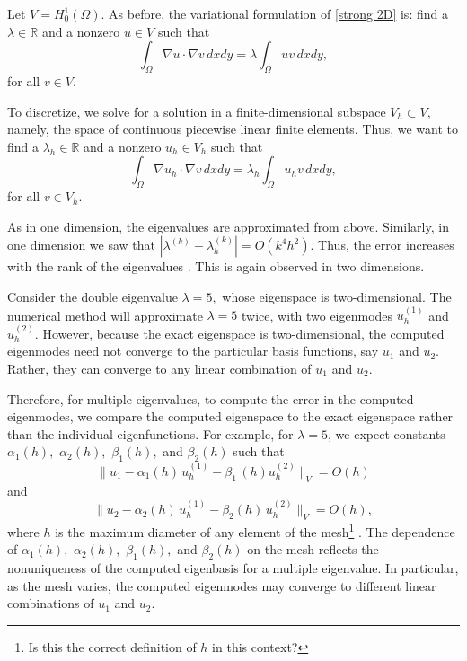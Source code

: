 \documentclass[12pt,a4paper]{article}
\theoremstyle{boldthm}
\theoremstyle{bolddefn}
\begin{document}
Let $V = H_0^1(\Omega).$ As before, the variational formulation of \eqref{strong 2D} is: find a $\lambda \in \mathbb{R}$ and a nonzero $u \in V$ such that
\begin{equation}
\int_{\Omega} \nabla u \cdot \nabla v \, dx dy = \lambda \int_{\Omega} u v \, dxdy,
\end{equation}
for all $v \in V.$


To discretize, we solve for a solution in a finite-dimensional subspace $V_h \subset V,$ namely, the space of continuous piecewise linear finite elements. Thus, we want to find a $\lambda_h \in \mathbb{R}$ and a nonzero $u_h \in V_h$ such that
\begin{equation}
    \int_{\Omega} \nabla u_h \cdot \nabla v \, dx dy = \lambda_h \int_{\Omega} u_h v \, dxdy, 
\end{equation}
for all $v \in V_h.$




As in one dimension, the eigenvalues are approximated from above. Similarly, in one dimension we saw that $| \lambda^{(k)} - \lambda_h^{(k)} | = O(k^4 h^2).$ Thus, the error increases with the rank of the eigenvalues \cite{boffi}. This is again observed in two dimensions.

Consider the double eigenvalue $\lambda = 5,$ whose eigenspace is two-dimensional. The numerical method will approximate $\lambda = 5$ twice, with two eigenmodes $u_h^{(1)}$ and $u_h^{(2)}$. However, because the exact eigenspace is two-dimensional, the computed eigenmodes need not converge to the particular basis functions, say $u_1$ and $u_2.$ Rather, they can converge to any linear combination of $u_1$ and $u_2.$ 

Therefore, for multiple eigenvalues, to compute the error in the computed eigenmodes, we compare the computed eigenspace to the exact eigenspace rather than the individual eigenfunctions. For example, for $\lambda = 5$, we expect constants $\alpha_1(h),$ $\alpha_2(h),$ $\beta_1(h),$ and $\beta_2(h)$ such that
\begin{equation}
    \| u_{1} - \alpha_1(h) \,u_h^{(1)} - \beta_1 \, (h) u_h^{(2)} \|_{V} = O(h)
\end{equation}
and
\begin{equation}
   \| u_{2} - \alpha_2(h)\, u_h^{(1)} - \beta_2(h)\, u_h^{(2)} \|_{V} = O(h), 
\end{equation}
where $h$ is the maximum diameter of any element of the mesh\footnote{Is this the correct definition of $h$ in this context?} \cite{boffi}. The dependence of $\alpha_1(h),$ $\alpha_2(h),$ $\beta_1(h),$ and $\beta_2(h)$ on the mesh 
reflects the nonuniqueness of the computed eigenbasis for a multiple eigenvalue. In particular, as the mesh varies, the computed eigenmodes may converge to different linear combinations of $u_1$ and $u_2.$  
\end{document}
